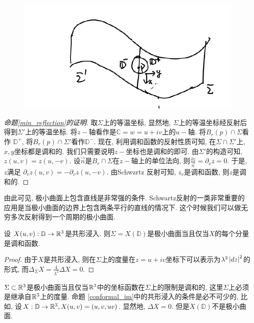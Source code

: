 \begin{figure}[h]
	\centering
	\includegraphics[scale=0.5]{images/reflection2.png}
	\caption{}
	\label{reflection2}
\end{figure}
\begin{proof}[命题\eqref{min_reflection}的证明]
    取$\Sigma$上的等温坐标, 显然地, $\Sigma$上的等温坐标经反射后得到$\Sigma'$上的等温坐标. 将$z-$轴看作是$\mathbb{C}={w=u+iv}$上的$u-$轴. 将$B_r(p)\cap \Sigma$看作 $\mathbb{D}^+$, 将$B_r(p) \cap \Sigma'$看作$\mathbb{D}^-$. 现在, 利用调和函数的反射性质可知, 在$\Sigma \cap \Sigma'$上, $x,y$坐标都是调和的. 我们只需要说明$z-$坐标也是调和的即可. 由$\Sigma'$的构造可知, $z(u,v)=z(u,-v)$. 设$\vec{n}$是$B_r\cap \Sigma$在$z-$轴上的单位法向, 则$\frac{\partial z}{\vec{n}}= \partial_v{z}=0$. 于是, $z$满足 $\partial_v z(u,v)=-\partial_v z(u,-v)$. 由Schwzrtz 反射可知, $z_v$是调和函数, 则$z$是调和的. 
\end{proof}
\begin{remark}
    由此可见, 极小曲面上包含直线是非常强的条件. Schwartz反射的一类非常重要的应用是当极小曲面的边界上包含两条平行的直线的情况下.  这个时候我们可以做无穷多次反射得到一个周期的极小曲面.
\end{remark}
\begin{proposition} \label{conformal_im}
    设 $X(u,v): \mathbb{D} \to \mathbb{R}^3$是共形浸入. 则$\Sigma = X(\mathbb{D})$是极小曲面当且仅当$X$的每个分量是调和函数.
\end{proposition}
\begin{proof}
    由于$X$是共形浸入, 则在$\Sigma$上的度量在$z=u+iv$坐标下可以表示为$\lambda^2\left | dz \right |^2$的形式, 而$\Delta_\Sigma X= \frac{4}{\lambda^2} \Delta X=0$.
\end{proof}
\begin{remark}
    $\Sigma\subset \mathbb{R}^3$是极小曲面当且仅当$\mathbb{R}^3$中的坐标函数在$\Sigma$上的限制是调和的, 这里$\Sigma$上必须是继承自$\mathbb{R}^3$上的度量. 命题 \eqref{conformal_im}中的共形浸入的条件是必不可少的, 比如, 设$X:\mathbb{D}\to \mathbb{R}^3, X(u,v)=(u,v,uv)$. 显然地, $\Delta X=0$. 但是$X(\mathbb{D})$不是极小曲面.
\end{remark}
